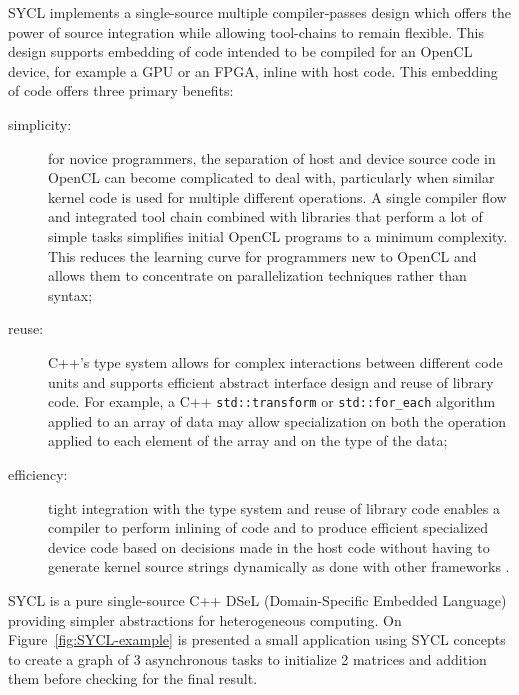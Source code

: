 \documentclass[sigplan, review]{acmart}
\begin{document}
SYCL implements a single-source multiple compiler-passes design which
offers the power of source integration while allowing tool-chains to
remain flexible. This design supports embedding of code intended to be
compiled for an OpenCL device, for example a GPU or an FPGA, inline
with host code. This embedding of code offers three primary benefits:
\begin{description}
\item[simplicity:] for novice programmers, the separation of host and
  device source code in OpenCL can become complicated to deal with,
  particularly when similar kernel code is used for multiple different
  operations. A single compiler flow and integrated tool chain
  combined with libraries that perform a lot of simple tasks
  simplifies initial OpenCL programs to a minimum complexity. This
  reduces the learning curve for programmers new to OpenCL and allows
  them to concentrate on parallelization techniques rather than
  syntax;
\item[reuse:] C++'s type system allows for complex interactions
  between different code units and supports efficient abstract
  interface design and reuse of library code.  For example, a C++
  \lstinline{std::transform} or \lstinline{std::for_each} algorithm
  applied to an array of data may allow specialization on both the
  operation applied to each element of the array and on the type of
  the data;
\item[efficiency:] tight integration with the type system and reuse of
  library code enables a compiler to perform inlining of code and to
  produce efficient specialized device code based on decisions made in
  the host code without having to generate kernel source strings
  dynamically as done with other frameworks \cite{VexCL,
    Boost.Compute}.
\end{description}

SYCL is a pure single-source C++ DSeL (Domain-Specific Embedded
Language) providing simpler abstractions for heterogeneous
computing. On Figure~\ref{fig:SYCL-example} is presented a small
application using SYCL concepts to create a graph of 3 asynchronous
tasks to initialize 2 matrices and addition them before checking for
the final result.
\end{document}
